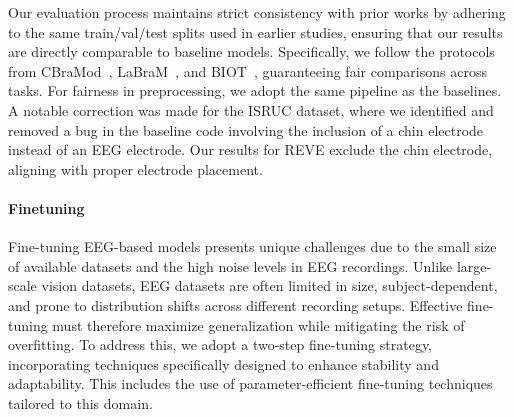 \documentclass{article}
\begin{document}
Our evaluation process maintains strict consistency with prior works by adhering to the same train/val/test splits used in earlier studies, ensuring that our results are directly comparable to baseline models. Specifically, we follow the protocols from CBraMod~\citep{wang2024cbramod}, LaBraM~\citep{jiang2024labram}, and BIOT~\citep{yang2024biot}, guaranteeing fair comparisons across tasks. For fairness in preprocessing, we adopt the same pipeline as the baselines. A notable correction was made for the ISRUC dataset, where we identified and removed a bug in the baseline code involving the inclusion of a chin electrode instead of an EEG electrode. Our results for REVE exclude the chin electrode, aligning with proper electrode placement.

\paragraph{Finetuning}
Fine-tuning EEG-based models presents unique challenges due to the small size of available datasets and the high noise levels in EEG recordings. Unlike large-scale vision datasets, EEG datasets are often limited in size, subject-dependent, and prone to distribution shifts across different recording setups. Effective fine-tuning must therefore maximize generalization while mitigating the risk of overfitting. To address this, we adopt a two-step fine-tuning strategy, incorporating techniques specifically designed to enhance stability and adaptability. This includes the use of parameter-efficient fine-tuning techniques~\citep{suzumura2024graph} tailored to this domain.
\end{document}
